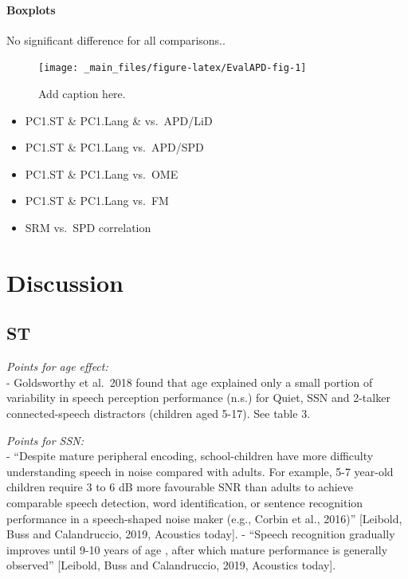\documentclass[a4paper, twoside]{templates/ociamthesis}
\begin{document}
\hypertarget{boxplots}{%
\paragraph{Boxplots}\label{boxplots}}

No significant difference for all comparisons..

\begin{figure}

{\centering \texttt{[image: \_main\_files/figure-latex/EvalAPD-fig-1]} 

}

\caption{Add caption here.}\label{fig:EvalAPD-fig}
\end{figure}

\begin{itemize}
\item
  PC1.ST \& PC1.Lang \& vs.~APD/LiD
\item
  PC1.ST \& PC1.Lang vs.~APD/SPD
\item
  PC1.ST \& PC1.Lang vs.~OME
\item
  PC1.ST \& PC1.Lang vs.~FM
\item
  SRM vs.~SPD correlation
\end{itemize}

\hypertarget{discussion-4}{%
\section{Discussion}\label{discussion-4}}

\hypertarget{st-2}{%
\subsection{ST}\label{st-2}}

\emph{Points for age effect:}\\
- Goldsworthy et al.~2018 found that age explained only a small portion of variability in speech perception performance (n.s.) for Quiet, SSN and 2-talker connected-speech distractors (children aged 5-17). See table 3.

\emph{Points for SSN:}\\
- ``Despite mature peripheral encoding, school-children have more difficulty understanding speech in noise compared with adults. For example, 5-7 year-old children require 3 to 6 dB more favourable SNR than adults to achieve comparable speech detection, word identification, or sentence recognition performance in a speech-shaped noise maker (e.g., Corbin et al., 2016)'' {[}Leibold, Buss and Calandruccio, 2019, Acoustics today{]}. - ``Speech recognition gradually improves until 9-10 years of age , after which mature performance is generally observed'' {[}Leibold, Buss and Calandruccio, 2019, Acoustics today{]}.
\end{document}
